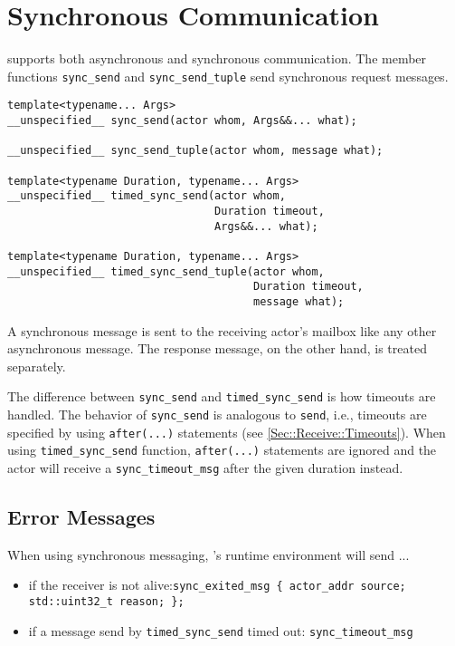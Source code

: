 \section{Synchronous Communication}
\label{Sec::Sync}

\lib supports both asynchronous and synchronous communication.
The member functions \lstinline^sync_send^ and \lstinline^sync_send_tuple^ send synchronous request messages.

\begin{lstlisting}
template<typename... Args>
__unspecified__ sync_send(actor whom, Args&&... what);

__unspecified__ sync_send_tuple(actor whom, message what);

template<typename Duration, typename... Args>
__unspecified__ timed_sync_send(actor whom,
                                Duration timeout,
                                Args&&... what);

template<typename Duration, typename... Args>
__unspecified__ timed_sync_send_tuple(actor whom,
                                      Duration timeout,
                                      message what);
\end{lstlisting}

A synchronous message is sent to the receiving actor's mailbox like any other asynchronous message.
The response message, on the other hand, is treated separately.

The difference between \lstinline^sync_send^ and \lstinline^timed_sync_send^ is how timeouts are handled.
The behavior of \lstinline^sync_send^ is analogous to \lstinline^send^, i.e., timeouts are specified by using \lstinline^after(...)^ statements (see \ref{Sec::Receive::Timeouts}).
When using \lstinline^timed_sync_send^ function, \lstinline^after(...)^ statements are ignored and the actor will receive a \lstinline^sync_timeout_msg^ after the given duration instead.

\subsection{Error Messages}

When using synchronous messaging, \lib's runtime environment will send ...

\begin{itemize}
\item if the receiver is not alive:\newline\lstinline^sync_exited_msg { actor_addr source; std::uint32_t reason; };^
\item if a message send by \lstinline^timed_sync_send^ timed out: \lstinline^sync_timeout_msg^
\end{itemize}

